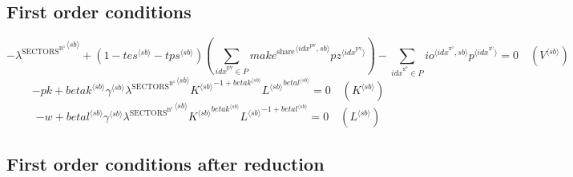 \subsection{First order conditions}

\begin{equation}
-{\lambda^{\mathrm{SECTORS}^{\mathrm{B}^{\mathrm{1}}}}}^{\langle {s\!b}\rangle} + \left(1 - {{t\!e\!s}}^{\langle {s\!b}\rangle} - {{t\!p\!s}}^{\langle {s\!b}\rangle}\right) \left(\sum_{{i\!d\!x}^{\mathrm{pv}}\in P} {{{m\!a\!k\!e}^{\mathrm{share}}}^{\langle {i\!d\!x}^{\mathrm{pv}},{s\!b}\rangle}} {{{p\!z}}^{\langle {i\!d\!x}^{\mathrm{pv}}\rangle}}\right) - \sum_{{i\!d\!x}^{\mathrm{x}^{\mathrm{o}}}\in P} {{{i\!o}}^{\langle {i\!d\!x}^{\mathrm{x}^{\mathrm{o}}},{s\!b}\rangle}} {{p}^{\langle {i\!d\!x}^{\mathrm{x}^{\mathrm{o}}}\rangle}} = 0
 \quad \left({V}^{\langle {s\!b}\rangle}\right)
\end{equation}
\begin{equation}
-{p\!k} + {{{b\!e\!t\!a\!k}}^{\langle {s\!b}\rangle}} {{\gamma}^{\langle {s\!b}\rangle}} {{\lambda^{\mathrm{SECTORS}^{\mathrm{B}^{\mathrm{1}}}}}^{\langle {s\!b}\rangle}} {{{K}^{\langle {s\!b}\rangle}}^{-1 + {{b\!e\!t\!a\!k}}^{\langle {s\!b}\rangle}}} {{{L}^{\langle {s\!b}\rangle}}^{{{b\!e\!t\!a\!l}}^{\langle {s\!b}\rangle}}} = 0
 \quad \left({K}^{\langle {s\!b}\rangle}\right)
\end{equation}
\begin{equation}
-w + {{{b\!e\!t\!a\!l}}^{\langle {s\!b}\rangle}} {{\gamma}^{\langle {s\!b}\rangle}} {{\lambda^{\mathrm{SECTORS}^{\mathrm{B}^{\mathrm{1}}}}}^{\langle {s\!b}\rangle}} {{{K}^{\langle {s\!b}\rangle}}^{{{b\!e\!t\!a\!k}}^{\langle {s\!b}\rangle}}} {{{L}^{\langle {s\!b}\rangle}}^{-1 + {{b\!e\!t\!a\!l}}^{\langle {s\!b}\rangle}}} = 0
 \quad \left({L}^{\langle {s\!b}\rangle}\right)
\end{equation}


\subsection{First order conditions after reduction}

